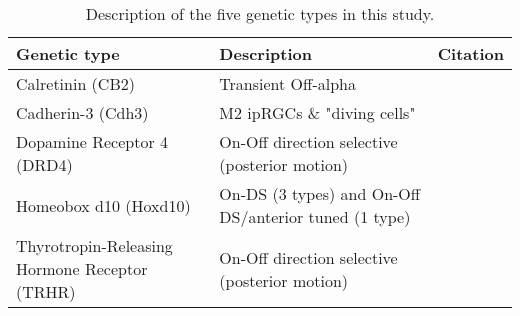 \documentclass[11pt]{article}
\date{}
\begin{document}
\singlespacing



\doublespacing

\begin{table}
\begin{tabular}{p{4.5cm} p{4cm} l}
  \toprule
  Genetic type & Description & Citation \\
  \midrule
  \footnotesize{Calretinin (CB2)} & \footnotesize{Transient Off-alpha}  & \footnotesize{\citetext{Huberman2008}}\\
  \footnotesize{Cadherin-3 (Cdh3)} & \footnotesize{M2 ipRGCs \& "diving cells"} & \footnotesize{\citetext{Osterhout2011}}\\
  \footnotesize{Dopamine Receptor 4 (DRD4)} & \footnotesize{On-Off direction selective (posterior motion)} & \footnotesize{\citetext{Huberman2009}}\\
  \footnotesize{Homeobox d10 (Hoxd10)} & \footnotesize{On-DS (3 types) and On-Off DS/anterior tuned (1 type)} & \footnotesize{\citetext{Dhande2013}}\\
  \footnotesize{Thyrotropin-Releasing Hormone Receptor (TRHR)} & \footnotesize{On-Off direction selective (posterior motion)}& \footnotesize{\citetext{RivlinEtzion2011}}\\
  \bottomrule
\end{tabular}
\caption{Description of the five genetic types in this study.}
\label{tab:geneticTypes}
\end{table}
\end{document}

